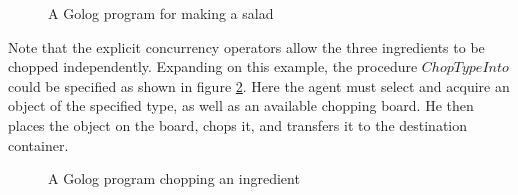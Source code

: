 %
\begin{figure}
\begin{centering}
\par\end{centering}

\caption{A Golog program for making a salad\label{fig:MIndiGolog:MakeSalad}}

\end{figure}


Note that the explicit concurrency operators allow the three ingredients
to be chopped independently. Expanding on this example, the procedure
$ChopTypeInto$ could be specified as shown in figure \ref{fig:MIndiGolog:ChopTypeInto}.
Here the agent must select and acquire an object of the specified
type, as well as an available chopping board. He then places the object
on the board, chops it, and transfers it to the destination container.

%
\begin{figure}
\begin{centering}
\par\end{centering}

\caption{A Golog program chopping an ingredient\label{fig:MIndiGolog:ChopTypeInto}}

\end{figure}


